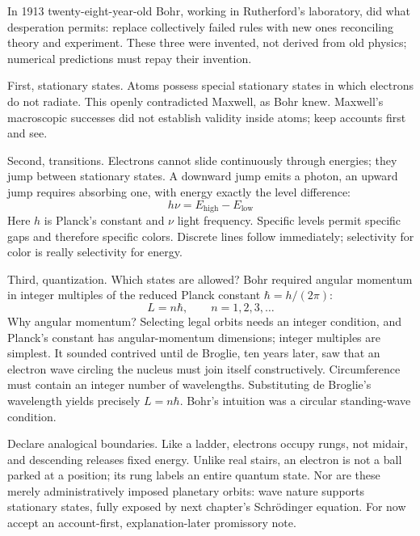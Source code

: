 
\begin{mainline}
In 1913 twenty-eight-year-old Bohr, working in Rutherford's laboratory, did what desperation permits: replace collectively failed rules with new ones reconciling theory and experiment. These three were invented, not derived from old physics; numerical predictions must repay their invention.

First, stationary states. Atoms possess special stationary states in which electrons do not radiate. This openly contradicted Maxwell, as Bohr knew. Maxwell's macroscopic successes did not establish validity inside atoms; keep accounts first and see.

Second, transitions. Electrons cannot slide continuously through energies; they jump between stationary states. A downward jump emits a photon, an upward jump requires absorbing one, with energy exactly the level difference:
\[
h\nu = E_{\text{high}}-E_{\text{low}}
\]
Here \(h\) is Planck's constant and \(\nu\) light frequency. Specific levels permit specific gaps and therefore specific colors. Discrete lines follow immediately; selectivity for color is really selectivity for energy.

Third, quantization. Which states are allowed? Bohr required angular momentum in integer multiples of the reduced Planck constant \(\hbar=h/(2\pi)\):
\[
L = n\hbar,\qquad n=1,2,3,\dots
\]
Why angular momentum? Selecting legal orbits needs an integer condition, and Planck's constant has angular-momentum dimensions; integer multiples are simplest. It sounded contrived until de Broglie, ten years later, saw that an electron wave circling the nucleus must join itself constructively. Circumference must contain an integer number of wavelengths. Substituting de Broglie's wavelength yields precisely \(L=n\hbar\). Bohr's intuition was a circular standing-wave condition.

Declare analogical boundaries. Like a ladder, electrons occupy rungs, not midair, and descending releases fixed energy. Unlike real stairs, an electron is not a ball parked at a position; its rung labels an entire quantum state. Nor are these merely administratively imposed planetary orbits: wave nature supports stationary states, fully exposed by next chapter's Schrödinger equation. For now accept an account-first, explanation-later promissory note.
\end{mainline}


